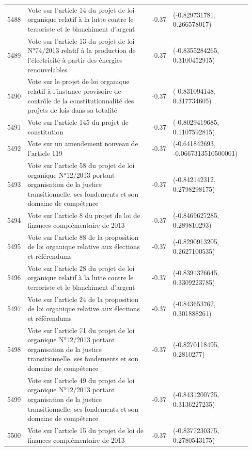 \begin{table}[ht]
\begin{tabular}{rlrl}
  5488 & Vote sur l'article 14 du projet de loi organique relatif à la lutte contre le terroriste et le blanchiment d'argent & -0.37 & (-0.829731781, 0.266578017) \\ 
  5489 & Vote sur l'article 13 du projet de loi N°74/2013 relatif à la production de l'électricité à partir des énergies renouvelables & -0.37 & (-0.8355284265, 0.3100452915) \\ 
  5490 & Vote sur le projet de loi organique relatif à l'instance provisoire de contrôle de la constitutionnalité des projets de lois dans sa totalité & -0.37 & (-0.831094148, 0.317734605) \\ 
  5491 & Vote sur l'article 145 du projet de constitution & -0.37 & (-0.8029419685, 0.1107592815) \\ 
  5492 & Vote sur un amendement nouveau de l'article 119 & -0.37 & (-0.641842693, -0.0667313510500001) \\ 
  5493 & Vote sur l'article 58 du projet de loi organique N°12/2013 portant organisation de la justice transitionnelle, ses fondements et son domaine de compétence & -0.37 & (-0.842142312, 0.2798298175) \\ 
  5494 & Vote sur l'article 8 du projet de loi de finances complémentaire de 2013 & -0.37 & (-0.8469627285, 0.289810293) \\ 
  5495 & Vote sur l'article 88 de la proposition de loi organique relative aux élections et référendums & -0.37 & (-0.8290913205, 0.2627100535) \\ 
  5496 & Vote sur l'article 28 du projet de loi organique relatif à la lutte contre le terroriste et le blanchiment d'argent & -0.37 & (-0.8391326645, 0.3309223785) \\ 
  5497 & Vote sur l'article 24 de la proposition de loi organique relative aux élections et référendums & -0.37 & (-0.843653762, 0.301888261) \\ 
  5498 & Vote sur l'article 71 du projet de loi organique N°12/2013 portant organisation de la justice transitionnelle, ses fondements et son domaine de compétence & -0.37 & (-0.8270118495, 0.2810277) \\ 
  5499 & Vote sur l'article 49 du projet de loi organique N°12/2013 portant organisation de la justice transitionnelle, ses fondements et son domaine de compétence & -0.37 & (-0.8431200725, 0.3136227235) \\ 
  5500 & Vote sur l'article 15 du projet de loi de finances complémentaire de 2013 & -0.37 & (-0.8377230375, 0.2780543175) \\ 

\end{tabular}
\end{table}
